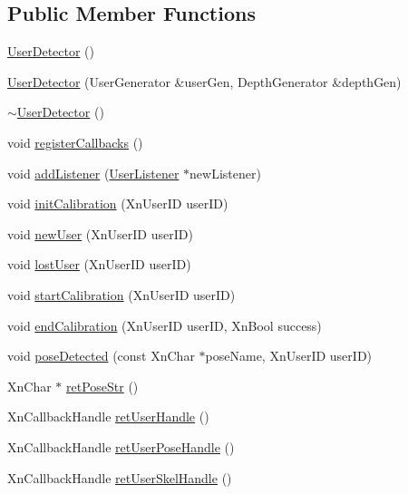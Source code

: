 \subsection*{Public Member Functions}
\begin{DoxyCompactItemize}
\item 
\hyperlink{classUserDetector_a1c71cbd2b85d7eda4d81021169aaaf57}{UserDetector} ()
\item 
\hyperlink{classUserDetector_afa46df6dc0cf46114755f04d3334e117}{UserDetector} (UserGenerator \&userGen, DepthGenerator \&depthGen)
\item 
\hyperlink{classUserDetector_ae17672b54f2a82d70ea5e22682cd0f0a}{$\sim$UserDetector} ()
\item 
void \hyperlink{classUserDetector_ac07661d3e60486c7ef25c2569a38d514}{registerCallbacks} ()
\item 
void \hyperlink{classUserDetector_ab7e1f7d8cbc37dcecd6b224fdd18f6c2}{addListener} (\hyperlink{classUserListener}{UserListener} $\ast$newListener)
\item 
void \hyperlink{classUserDetector_a34432616a52932934e8799f90aefc65a}{initCalibration} (XnUserID userID)
\item 
void \hyperlink{classUserDetector_a42845024a854fd79a714c00cfd5fd59b}{newUser} (XnUserID userID)
\item 
void \hyperlink{classUserDetector_a486ca42bbdc01ef853c82b36cda7cc84}{lostUser} (XnUserID userID)
\item 
void \hyperlink{classUserDetector_a2681776dca3ec63bfc77528504354512}{startCalibration} (XnUserID userID)
\item 
void \hyperlink{classUserDetector_a89a1b34569957c5cd4001c72561b554c}{endCalibration} (XnUserID userID, XnBool success)
\item 
void \hyperlink{classUserDetector_aa1aca77e875b9ab9b2b0b29d55672885}{poseDetected} (const XnChar $\ast$poseName, XnUserID userID)
\item 
XnChar $\ast$ \hyperlink{classUserDetector_a4119f90fe93f3803fe1daa083cc33a6b}{retPoseStr} ()
\item 
XnCallbackHandle \hyperlink{classUserDetector_aa031f0e31c840bb0cc0926dc57c9e634}{retUserHandle} ()
\item 
XnCallbackHandle \hyperlink{classUserDetector_aaf575a95cfe6d448c9869cabd873cf8d}{retUserPoseHandle} ()
\item 
XnCallbackHandle \hyperlink{classUserDetector_a556ec55f8cfc05990c369392a46a9951}{retUserSkelHandle} ()
\item 

\end{DoxyCompactItemize}
